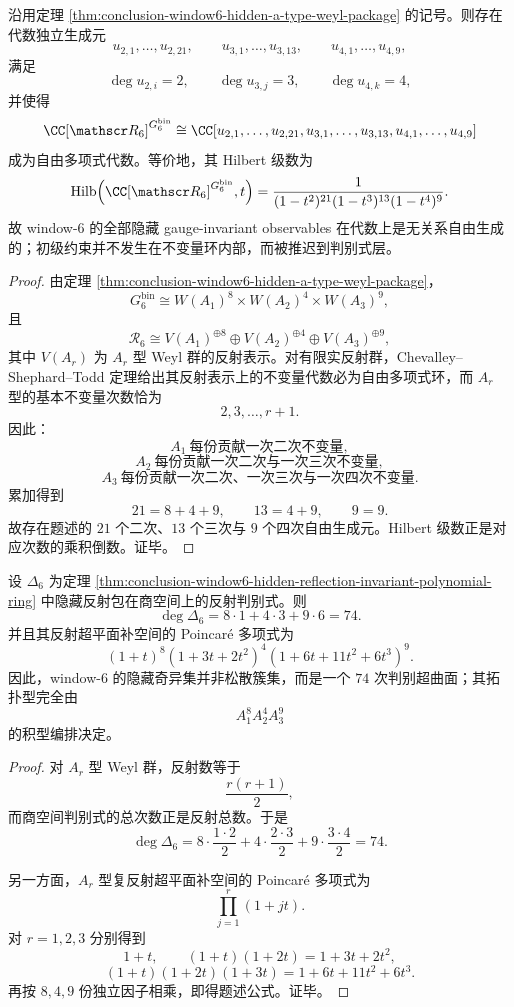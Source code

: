\begin{theorem}[隐藏反射包不变量代数的自由多项式结构]\label{thm:conclusion-window6-hidden-reflection-invariant-polynomial-ring}
沿用定理 \ref{thm:conclusion-window6-hidden-a-type-weyl-package} 的记号。则存在代数独立生成元
\[
u_{2,1},\dots,u_{2,21},\qquad
u_{3,1},\dots,u_{3,13},\qquad
u_{4,1},\dots,u_{4,9},
\]
满足
\[
\deg u_{2,i}=2,\qquad
\deg u_{3,j}=3,\qquad
\deg u_{4,k}=4,
\]
并使得
\[
\CC[\mathscr R_6]^{G_6^{\mathrm{bin}}}
\cong
\CC[u_{2,1},\dots,u_{2,21},u_{3,1},\dots,u_{3,13},u_{4,1},\dots,u_{4,9}]
\]
成为自由多项式代数。等价地，其 Hilbert 级数为
\[
\mathrm{Hilb}\!\left(\CC[\mathscr R_6]^{G_6^{\mathrm{bin}}},t\right)
=
\frac{1}{(1-t^2)^{21}(1-t^3)^{13}(1-t^4)^9}.
\]
故 window-\(6\) 的全部隐藏 gauge-invariant observables 在代数上是无关系自由生成的；初级约束并不发生在不变量环内部，而被推迟到判别式层。
\end{theorem}
\begin{proof}
由定理 \ref{thm:conclusion-window6-hidden-a-type-weyl-package}，
\[
G_6^{\mathrm{bin}}
\cong
W(A_1)^{8}\times W(A_2)^{4}\times W(A_3)^{9},
\]
且
\[
\mathscr R_6
\cong
V(A_1)^{\oplus 8}\oplus V(A_2)^{\oplus 4}\oplus V(A_3)^{\oplus 9},
\]
其中 \(V(A_r)\) 为 \(A_r\) 型 Weyl 群的反射表示。对有限实反射群，Chevalley--Shephard--Todd 定理给出其反射表示上的不变量代数必为自由多项式环，而 \(A_r\) 型的基本不变量次数恰为
\[
2,3,\dots,r+1.
\]
因此：
\[
A_1\ \text{每份贡献一次二次不变量},
\]
\[
A_2\ \text{每份贡献一次二次与一次三次不变量},
\]
\[
A_3\ \text{每份贡献一次二次、一次三次与一次四次不变量}.
\]
累加得到
\[
21=8+4+9,\qquad
13=4+9,\qquad
9=9.
\]
故存在题述的 \(21\) 个二次、\(13\) 个三次与 \(9\) 个四次自由生成元。Hilbert 级数正是对应次数的乘积倒数。证毕。
\end{proof}

\begin{corollary}\label{cor:conclusion-window6-reflection-discriminant-degree-poincare}
设 \(\Delta_6\) 为定理 \ref{thm:conclusion-window6-hidden-reflection-invariant-polynomial-ring} 中隐藏反射包在商空间上的反射判别式。则
\[
\deg \Delta_6
=
8\cdot 1+4\cdot 3+9\cdot 6
=
74.
\]
并且其反射超平面补空间的 Poincaré 多项式为
\[
(1+t)^8(1+3t+2t^2)^4(1+6t+11t^2+6t^3)^9.
\]
因此，window-\(6\) 的隐藏奇异集并非松散簇集，而是一个 \(74\) 次判别超曲面；其拓扑型完全由
\[
A_1^8A_2^4A_3^9
\]
的积型编排决定。
\end{corollary}
\begin{proof}
对 \(A_r\) 型 Weyl 群，反射数等于
\[
\frac{r(r+1)}{2},
\]
而商空间判别式的总次数正是反射总数。于是
\[
\deg\Delta_6
=
8\cdot \frac{1\cdot 2}{2}
+4\cdot \frac{2\cdot 3}{2}
+9\cdot \frac{3\cdot 4}{2}
=
74.
\]

另一方面，\(A_r\) 型复反射超平面补空间的 Poincaré 多项式为
\[
\prod_{j=1}^{r}(1+jt).
\]
对 \(r=1,2,3\) 分别得到
\[
1+t,\qquad
(1+t)(1+2t)=1+3t+2t^2,
\]
\[
(1+t)(1+2t)(1+3t)=1+6t+11t^2+6t^3.
\]
再按 \(8,4,9\) 份独立因子相乘，即得题述公式。证毕。
\end{proof}


